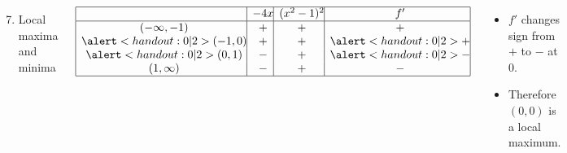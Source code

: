 \begin{frame}[t]
\begin{example}
\begin{columns}[t]
\begin{enumerate}
\setcounter{enumi}{6}
\item  Local maxima and minima
\end{enumerate}
\[
\begin{array}{|c@{}|c@{}|c@{}|c@{}|}
\hline
& -4x & (x^2-1)^2 & f' \\
\hline
(-\infty , -1) & + & + & + \\
\alert<handout:0| 2>{(-1 , 0)} & + & + & \alert<handout:0| 2>{+} \\
\alert<handout:0| 2>{(0 , 1)} & - & + & \alert<handout:0| 2>{-} \\
(1 , \infty) & - & + & - \\
\hline
\end{array}
\]
\begin{itemize}
\item<2->  $f'$ changes sign from $+$ to $-$ at $0$.
\item<3->  Therefore $(0,0)$ is a local maximum.
\end{itemize}
\end{columns}
\end{example}
\end{frame}


